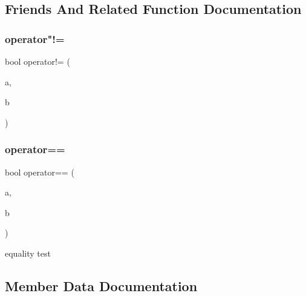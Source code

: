 \subsection{Friends And Related Function Documentation}
\mbox{\label{class_c_coins_a42ef9fcc8ca59916b5fb69904db1c9bd}} 
\subsubsection{\texorpdfstring{operator"!=}{operator!=}}
{\footnotesize\ttfamily bool operator!= (\begin{DoxyParamCaption}\item[{const \mbox{\hyperlink{class_c_coins}{C\+Coins}} \&}]{a,  }\item[{const \mbox{\hyperlink{class_c_coins}{C\+Coins}} \&}]{b }\end{DoxyParamCaption})\hspace{0.3cm}{\ttfamily [friend]}}

\mbox{\label{class_c_coins_a77593e3db3e4b369c21a91aad2afcc05}} 
\subsubsection{\texorpdfstring{operator==}{operator==}}
{\footnotesize\ttfamily bool operator== (\begin{DoxyParamCaption}\item[{const \mbox{\hyperlink{class_c_coins}{C\+Coins}} \&}]{a,  }\item[{const \mbox{\hyperlink{class_c_coins}{C\+Coins}} \&}]{b }\end{DoxyParamCaption})\hspace{0.3cm}{\ttfamily [friend]}}



equality test 



\subsection{Member Data Documentation}
\mbox{\label{class_c_coins_adeedfaef84ba39b6e295d5d1fb9d8f0b}} 
